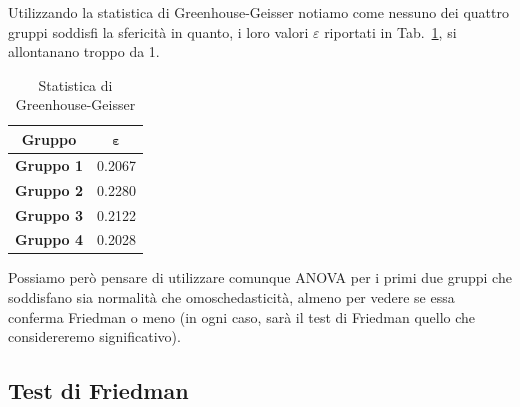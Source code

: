 \documentclass[conference]{IEEEtran}
\begin{document}
Utilizzando la statistica di Greenhouse-Geisser notiamo come nessuno dei quattro gruppi
soddisfi la sfericità in quanto, i loro valori $\varepsilon$ riportati in Tab.~\ref{tab4},
si allontanano troppo da 1.
\begin{table}[htbp]
    \caption{Statistica di Greenhouse-Geisser}
    \begin{center}
    \begin{tabular}{|c|c|}
    \hline
    \textbf{Gruppo} & $\boldsymbol{\varepsilon}$\\
    \hline
    \textbf{Gruppo 1} & 0.2067 \\\cline{1-2}
    \textbf{Gruppo 2} & 0.2280 \\\cline{1-2}
    \textbf{Gruppo 3} & 0.2122 \\\cline{1-2}
    \textbf{Gruppo 4} & 0.2028 \\\cline{1-2}
    \hline
    \end{tabular}
    \label{tab4}
    \end{center}
\end{table}
Possiamo però pensare di utilizzare comunque ANOVA per i primi due gruppi
che soddisfano sia normalità che omoschedasticità, almeno per vedere
se essa conferma Friedman o meno (in ogni caso, sarà il test di Friedman
quello che considereremo significativo).

\subsection{Test di Friedman}
\end{document}
